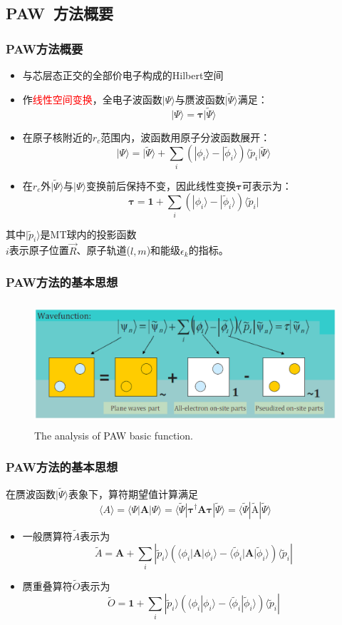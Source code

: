 \documentclass[cjk,slidestop,compress,mathserif,blue]{beamer}
\begin{document}
\subsection{\rm{PAW~}方法概要}
\frame
{
	\frametitle{\textrm{PAW}方法概要}
\begin{itemize}
	\item 与芯层态正交的全部价电子构成的\textrm{Hilbert}空间%
	\item 作\textcolor{red}{线性空间变换}，全电子波函数$|\Psi\rangle$与赝波函数$|\tilde\Psi\rangle$满足：
		$$|\Psi\rangle=\mathbf{\tau|}\tilde\Psi\rangle$$
	\item 在原子核附近的$r_c$范围内，波函数用原子分波函数展开：
	$$|\Psi\rangle=|\tilde\Psi\rangle+\sum_i(|\phi_i\rangle-|\tilde\phi_i\rangle)\langle\tilde p_i|\tilde\Psi\rangle$$
	\item 在$r_c$外$|\tilde\Psi\rangle$与$|\Psi\rangle$变换前后保持不变，因此线性变换$\mathbf{\tau}$可表示为：
	$$\mathbf{\tau}=\mathbf{1}+\sum_i(|\phi_i\rangle-|\tilde\phi_i\rangle)\langle\tilde p_i|$$
\end{itemize}
其中$|\tilde p_i\rangle$是\textrm{MT}球内的投影函数\\
$i$表示原子位置$\vec R$、原子轨道($l,m$)和能级$\epsilon_k$的指标。
}

\frame
{
	\frametitle{\textrm{PAW}方法的基本思想}
	\vspace{10pt}
\begin{figure}[h!]
\centering
\includegraphics[height=1.8in,width=4.in,viewport=30 210 570 440,clip]{Figures/PAW_projector.eps}
\caption{\tiny \textrm{The analysis of PAW basic function.}}%
\label{PAW_baisc}
\end{figure}
}

\frame
{
\frametitle{\textrm{PAW}方法的基本思想}
	在赝波函数$|\tilde\Psi\rangle$表象下，算符期望值计算满足$$\langle A \rangle=\langle\Psi|\mathbf{A}|\Psi\rangle=\langle\tilde\Psi|\mathbf{\tau}^{\dag}\mathbf{A}\mathbf{\tau}|\tilde\Psi\rangle=\langle\tilde\Psi|\tilde{\mathrm{A}}|\tilde\Psi\rangle$$
\begin{itemize}
	\item 一般赝算符$\tilde A$表示为
		$$\tilde A=\mathbf{A}+\sum_i|\tilde p_i\rangle(\langle\phi_i|\mathbf{A}|\phi_i\rangle-\langle\tilde\phi_i|\mathbf{A}|\tilde\phi_i\rangle)\langle\tilde p_i|$$
	\item 赝重叠算符$\tilde O$表示为
		$$\tilde O=\mathbf{1}+\sum_i|\tilde p_i\rangle(\langle\phi_i|\phi_i\rangle-\langle\tilde\phi_i|\tilde\phi_i\rangle)\langle\tilde p_i|$$
\end{itemize}
}
\end{document}
